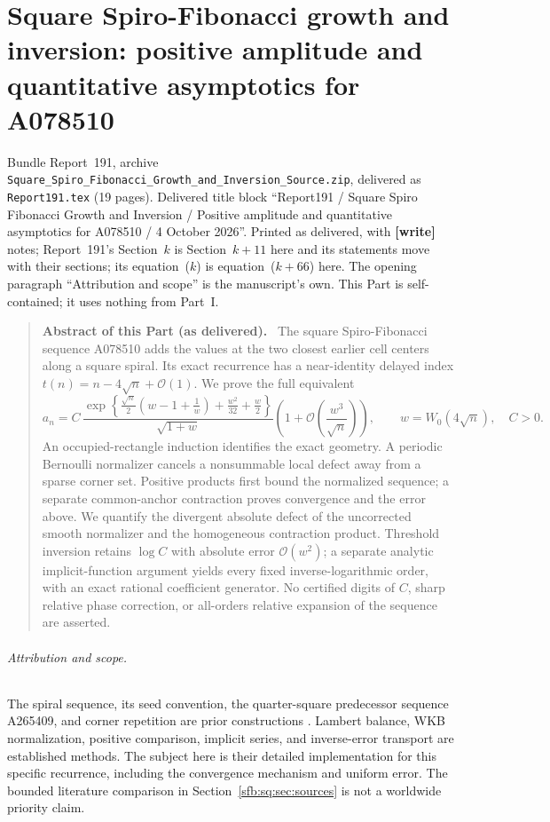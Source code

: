 \documentclass[11pt]{article}
\theoremstyle{remark}\newtheorem{remark}[theorem]{Remark}
\newcommand{\OO}{\mathcal O}
\newcommand{\file}[1]{\nolinkurl{#1}}
\newenvironment{partabstract}{\begin{quote}\small\noindent\textbf{Abstract of this Part (as delivered).}\ }{\end{quote}}
\newcommand{\partsource}[1]{\par\noindent\begin{minipage}{\textwidth}\small #1\end{minipage}\par\medskip}
\begin{document}
\part{Square Spiro-Fibonacci growth and inversion: positive amplitude and quantitative asymptotics for A078510}\label{sfb:sq:part}
\partsource{Bundle Report~191, archive \file{Square_Spiro_Fibonacci_Growth_and_Inversion_Source.zip}, delivered as \file{Report191.tex} (19 pages). Delivered title block ``Report191 / Square Spiro Fibonacci Growth and Inversion / Positive amplitude and quantitative asymptotics for A078510 / 4 October 2026''. Printed as delivered, with \textbf{[write]} notes; Report~191's Section~$k$ is Section~$k+11$ here and its statements move with their sections; its equation~($k$) is equation~($k+66$) here. The opening paragraph ``Attribution and scope'' is the manuscript's own. This Part is self-contained; it uses nothing from Part~I.}
\begin{partabstract}
The square Spiro-Fibonacci sequence A078510 adds the values at the two closest earlier cell centers along a square spiral. Its exact recurrence has a near-identity delayed index $t(n)=n-4\sqrt n+\OO(1)$. We prove the full equivalent
\[
 a_n=C\,\frac{\exp\!\left\{\frac{\sqrt n}{2}
 \left(w-1+\frac1w\right)+\frac{w^2}{32}+\frac w2\right\}}
 {\sqrt{1+w}}\left(1+\OO\!\left(\frac{w^3}{\sqrt n}\right)\right),
 \qquad w=W_0(4\sqrt n),\quad C>0.
\]
An occupied-rectangle induction identifies the exact geometry. A periodic Bernoulli normalizer cancels a nonsummable local defect away from a sparse corner set. Positive products first bound the normalized sequence; a separate common-anchor contraction proves convergence and the error above. We quantify the divergent absolute defect of the uncorrected smooth normalizer and the homogeneous contraction product. Threshold inversion retains $\log C$ with absolute error $\OO(w^2)$; a separate analytic implicit-function argument yields every fixed inverse-logarithmic order, with an exact rational coefficient generator. No certified digits of $C$, sharp relative phase correction, or all-orders relative expansion of the sequence are asserted.
\end{partabstract}

\paragraph{Attribution and scope.}
The spiral sequence, its seed convention, the quarter-square predecessor sequence A265409, and corner repetition are prior constructions \cite{fernandez,oeis510,oeis409,ryde}. Lambert balance, WKB normalization, positive comparison, implicit series, and inverse-error transport are established methods. The subject here is their detailed implementation for this specific recurrence, including the convergence mechanism and uniform error. The bounded literature comparison in Section~\ref{sfb:sq:sec:sources} is not a worldwide priority claim.
\end{document}
